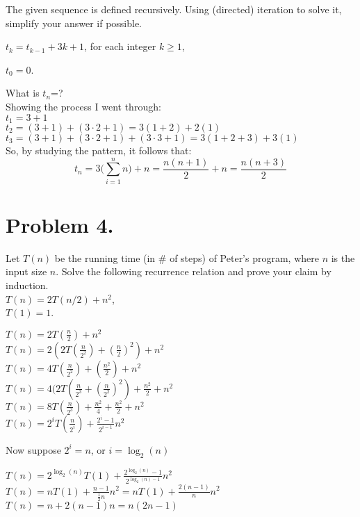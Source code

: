 \documentclass[11pt]{article}
\begin{document}
The given sequence is defined recursively. Using (directed) iteration to solve it, simplify your answer if possible.

$t_k=t_{k-1}+3k+1$, for each integer $k\geq 1$,

$t_0=0$.
\newline

What is $t_n$=?\\

Showing the process I went through:\\
$t_1 = 3 + 1$\\
$t_2 = (3+1)+(3 \cdot 2 +1) = 3(1+2) +2(1)$\\
$t_3 = (3+1)+(3 \cdot 2 +1) + (3 \cdot 3 +1) = 3(1+2+3) + 3(1)$\\

So, by studying the pattern, it follows that:
\[t_n = 3 \Big(\sum\limits^n_{i=1} n\Big) +n = \frac{n(n+1)}{2} + n = \boxed{\frac{n(n+3)}{2}}\]

\newpage

\noindent
\section*{Problem 4.}

Let $T(n)$ be the running time (in \# of steps) of Peter's program, where $n$ is the input size $n$.
Solve the following recurrence relation and prove your claim by induction.\\
$T(n)=2T(n/2)+n^2$,\\
$T(1)=1$.
\newline

\noindent
\begin{center}

$T(n) = 2T(\frac{n}{2}) + n^2$\\
$T(n) = 2(2T(\frac{n}{2^2}) + (\frac{n}{2})^2) +n^2$\\
$T(n) = 4T(\frac{n}{2^2}) + (\frac{n^2}{2}) +n^2$\\
$T(n) = 4(2T(\frac{n}{2^3} + (\frac{n}{2^2})^2)+\frac{n^2}{2} + n^2$\\
$T(n) = 8T(\frac{n}{2^3}) + \frac{n^2}{4} + \frac{n^2}{2} + n^2$\\
$T(n) = 2^i T(\frac{n}{2^i}) + \frac{2^i -1}{2^{i-1}}n^2$
\end{center}

Now suppose $2^i = n$, or $i = \log_2(n)$

\begin{center}
    $T(n) = 2^{\log_2(n)} T(1) + \frac{2^{\log_2(n)} - 1}{2^{\log_2(n)-1}}n^2$\\
    $T(n) = nT(1) + \frac{n-1}{\frac{1}{2}n}n^2 = nT(1) + \frac{2(n-1)}{n}n^2$
    $T(n) = n + 2(n-1)n = n(2n -1)$
\end{center}
\end{document}
